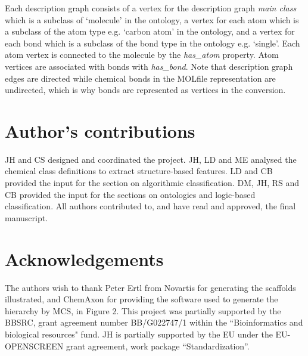 \documentclass[10pt]{bmc_article}
\newenvironment{bmcformat}{\baselineskip20pt\sloppy\setboolean{publ}{false}}{\baselineskip20pt\sloppy}
\begin{document}
\begin{bmcformat}
Each description graph consists of a vertex for the description graph \textit{main class} which is a subclass of `molecule' in the ontology, a vertex for each atom which is a subclass of the atom type e.g. `carbon atom' in the ontology, and a vertex for each bond which is a subclass of the bond type in the ontology e.g. `single'. Each atom vertex is connected to the molecule by the \textit{has\_atom} property. Atom vertices are associated with bonds with \textit{has\_bond}. Note that description graph edges are directed while chemical bonds in the MOLfile representation are undirected, which is why bonds are represented as vertices in the conversion. 

\bigskip


\section*{Author's contributions}
    JH and CS designed and coordinated the project. JH, LD and ME analysed the chemical class definitions to extract structure-based features. LD and CB provided the input for the section on algorithmic classification. DM, JH, RS and CB provided the input for the sections on ontologies and logic-based classification. All authors contributed to, and have read and approved, the final manuscript. 

    

\section*{Acknowledgements}
The authors wish to thank Peter Ertl from Novartis for generating the scaffolds illustrated, and ChemAxon for providing the software used to generate the hierarchy by MCS, in Figure 2. This project was partially supported by the BBSRC, grant agreement number BB/G022747/1 within the ``Bioinformatics and biological resources" fund. JH is partially supported by the EU under the EU-OPENSCREEN grant agreement, work package ``Standardization''. 
 


\end{bmcformat}
\end{document}
